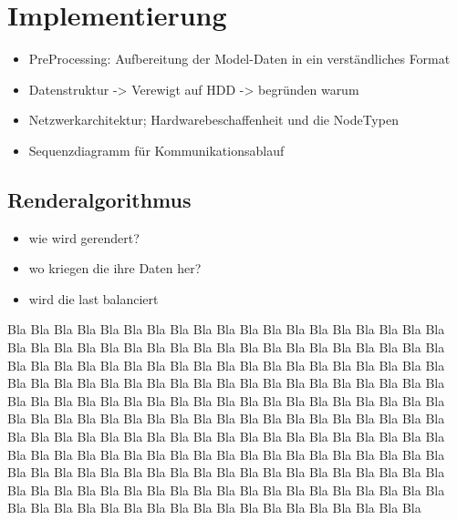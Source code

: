 
\chapter{Implementierung}
\label{implementation}

\begin{itemize}
 \item PreProcessing: Aufbereitung der Model-Daten in ein verständliches Format
 \item Datenstruktur -> Verewigt auf HDD -> begründen warum
 \item Netzwerkarchitektur; Hardwarebeschaffenheit und die NodeTypen
 \item Sequenzdiagramm für Kommunikationsablauf
\end{itemize}

\section{Renderalgorithmus}
\begin{itemize}
 \item wie wird gerendert?
 \item wo kriegen die ihre Daten her?
 \item wird die last balanciert
\end{itemize}

Bla Bla Bla Bla Bla Bla Bla Bla Bla Bla Bla Bla Bla Bla Bla Bla Bla Bla Bla Bla
Bla Bla Bla Bla Bla Bla Bla Bla Bla Bla Bla Bla Bla Bla Bla Bla Bla Bla Bla Bla
Bla Bla Bla Bla Bla Bla Bla Bla Bla Bla Bla Bla Bla Bla Bla Bla Bla Bla Bla Bla
Bla Bla Bla Bla Bla Bla Bla Bla Bla Bla Bla Bla Bla Bla Bla Bla Bla Bla Bla Bla
Bla Bla Bla Bla Bla Bla Bla Bla Bla Bla Bla Bla Bla Bla Bla Bla Bla Bla Bla Bla
Bla Bla Bla Bla Bla Bla Bla Bla Bla Bla Bla Bla Bla Bla Bla Bla Bla Bla Bla Bla
Bla Bla Bla Bla Bla Bla Bla Bla Bla Bla Bla Bla Bla Bla Bla Bla Bla Bla Bla Bla
Bla Bla Bla Bla Bla Bla Bla Bla Bla Bla Bla Bla Bla Bla Bla Bla Bla Bla Bla Bla
Bla Bla Bla Bla Bla Bla Bla Bla Bla Bla Bla Bla Bla Bla Bla Bla Bla Bla Bla Bla
Bla Bla Bla Bla Bla Bla Bla Bla Bla Bla Bla Bla Bla Bla Bla Bla Bla Bla Bla Bla
Bla Bla Bla Bla Bla Bla Bla Bla

%
%

